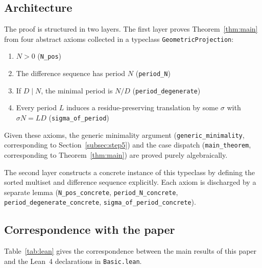 \documentclass[11pt]{article}
\theoremstyle{plain}
\theoremstyle{definition}
\theoremstyle{remark}
\begin{document}
\subsection{Architecture}\label{subsec:lean_arch}

The proof is structured in two layers.  The first layer proves
Theorem~\ref{thm:main} from four abstract axioms collected in a
typeclass \texttt{GeometricProjection}:
\begin{enumerate}
    \item $N > 0$ \hfill (\texttt{N\_pos})
    \item The difference sequence has period $N$
          \hfill (\texttt{period\_N})
    \item If $D \mid N$, the minimal period is $N/D$
          \hfill (\texttt{period\_degenerate})
    \item Every period $L$ induces a residue-preserving translation
          by some $\sigma$ with $\sigma N = LD$
          \hfill (\texttt{sigma\_of\_period})
\end{enumerate}
Given these axioms, the generic minimality argument
(\texttt{generic\_minimality}, corresponding to
Section~\ref{subsec:step5}) and the case dispatch
(\texttt{main\_theorem}, corresponding to Theorem~\ref{thm:main})
are proved purely algebraically.

The second layer constructs a concrete instance of this typeclass
by defining the sorted multiset and difference sequence explicitly.
Each axiom is discharged by a separate lemma
(\texttt{N\_pos\_concrete}, \texttt{period\_N\_concrete},
\texttt{period\_degenerate\_concrete},
\texttt{sigma\_of\_period\_concrete}).

\subsection{Correspondence with the paper}\label{subsec:lean_corr}

Table~\ref{tab:lean} gives the correspondence between the main
results of this paper and the Lean~4 declarations in
\texttt{Basic.lean}.
\end{document}

